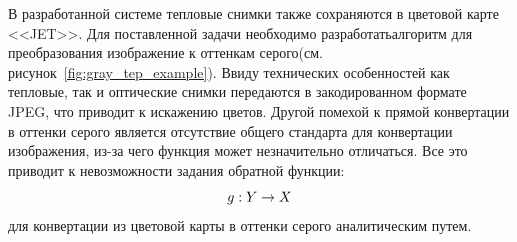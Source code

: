 \documentclass[14pt, a4paper]{extreport}
\begin{document}
	В разработанной системе тепловые снимки также сохраняются в цветовой карте <<JET>>. Для поставленной задачи необходимо разработать\linebreak алгоритм для преобразования изображение к оттенкам серого\linebreak (см. рисунок~\ref{fig:gray_tep_example}). Ввиду технических особенностей как тепловые, так и оптические снимки передаются в закодированном формате JPEG, что приводит к искажению цветов. Другой помехой к прямой конвертации в оттенки серого является отсутствие общего стандарта для конвертации изображения, из-за чего функция может незначительно отличаться. Все это приводит к невозможности задания обратной функции:
	\vspace*{-0.2cm}
	\begin{equation}
		g: Y \rightarrow X
		\label{eq:gYX}
		\vspace*{-0.4cm}
	\end{equation}
	для конвертации из цветовой карты в оттенки серого аналитическим путем. 
\end{document}
